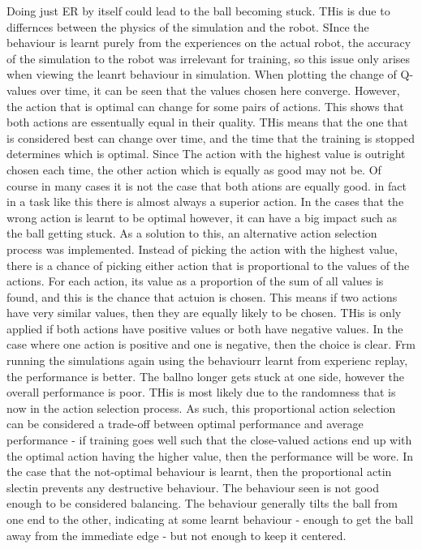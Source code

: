 \documentclass[12pt,a4paper]{article}
\begin{document}
Doing just ER by itself could lead to the ball becoming stuck. THis is due to differnces between the physics of the simulation and the robot. SInce the behaviour is learnt purely from the experiences on the actual robot, the accuracy of the simulation to the robot was irrelevant for training, so this issue only arises when viewing the leanrt behaviour in simulation. When plotting the change of Q-values over time, it can be seen that the values chosen here converge. However, the action that is optimal can change for some pairs of actions. This shows that both actions are essentually equal in their quality. THis means that the one that is considered best can change over time, and the time that the training is stopped determines which is optimal. Since The action with the highest value is outright chosen each time, the other action which is equally as good may not be. Of course in many cases it is not the case that both ations are equally good. in fact in a task like this there is almost always a superior action. In the cases that the wrong action is learnt to be optimal however, it can have a big impact such as the ball getting stuck. As a solution to this, an alternative action selection process was implemented. Instead of picking the action with the highest value, there is a chance of picking either action that is proportional to the values of the actions. For each action, its value as a proportion of the sum of all values is found, and this is the chance that actuion is chosen. This means if two actions have very similar values, then they are equally likely to be chosen. THis is only applied if both actions have positive values or both have negative values. In the case where one action is positive and one is negative, then the choice is clear. Frm running the simulations again using the behaviourr learnt from experienc replay, the performance is better. The ballno longer gets stuck at one side, however the overall performance is poor. THis is most likely due to the randomness that is now in the action selection process. As such, this proportional action selection can be considered a trade-off between optimal performance and average performance - if training goes well such that the close-valued actions end up with the optimal action having the higher value, then the performance will be wore. In the case that the not-optimal behaviour is learnt, then the proportional actin slectin prevents any destructive behaviour. The behaviour seen is not good enough to be considered balancing. The behaviour generally tilts the ball from one end to the other, indicating at some learnt behaviour - enough to get the ball away from the immediate edge - but not enough to keep it centered. 
\end{document}
